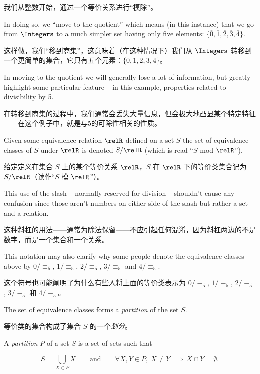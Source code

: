 我们从整数开始，通过一个等价关系进行“模除”。

In doing so, we
``move to the quotient'' which means (in this instance) that we go from $\Integers$ to a much simpler set
having only five elements: $\{ \overline{0}, \overline{1}, \overline{2}, \overline{3}, 
\overline{4} \}$.

这样做，我们“移到商集”，这意味着（在这种情况下）我们从 $\Integers$ 转移到一个更简单的集合，它只有五个元素：$\{ \overline{0}, \overline{1}, \overline{2}, \overline{3}, \overline{4} \}$。

In moving to the quotient we will generally lose a lot of information, 
but greatly highlight some particular feature -- in this example, properties related to 
divisibility by 5.

在转移到商集的过程中，我们通常会丢失大量信息，但会极大地凸显某个特定特征——在这个例子中，就是与5的可除性相关的性质。
 
Given some equivalence relation $\relR$ defined on a set $S$ the set of equivalence classes
of $S$ under $\relR$ is denoted $S/\relR$ (which is read ``$S$ mod $\relR$'').

给定定义在集合 $S$ 上的某个等价关系 $\relR$，$S$ 在 $\relR$ 下的等价类集合记为 $S/\relR$（读作“$S$ 模 $\relR$”）。

This use of the
slash -- normally reserved for division -- shouldn't cause any confusion since those aren't 
numbers on either side of the slash but rather a set and a relation.

这种斜杠的用法——通常为除法保留——不应引起任何混淆，因为斜杠两边的不是数字，而是一个集合和一个关系。

This
notation may also clarify why some people denote the equivalence classes above
by $0/\equiv_5$, $1/\equiv_5$, $2/\equiv_5$, $3/\equiv_5$ and  $4/\equiv_5$.

这个符号也可能阐明了为什么有些人将上面的等价类表示为 $0/\equiv_5$, $1/\equiv_5$, $2/\equiv_5$, $3/\equiv_5$ 和 $4/\equiv_5$。

The set of equivalence
classes forms a  \emph{partition} of the set $S$.

等价类的集合构成了集合 $S$ 的一个\emph{划分}。

\begin{defi} A \emph{partition} $P$ of a set $S$ is a set of sets such that

\[ S = \bigcup_{X \in P} X \qquad \mbox{and} \qquad %
\forall X, Y \in P, \;
X \neq Y \, \implies \, X \cap Y = \emptyset.
\]

\end{defi}

